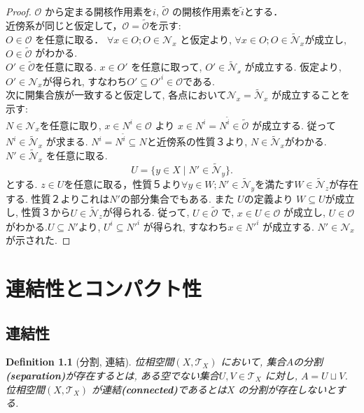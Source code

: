 \documentclass[dvipdfmx]{jbook}
\newtheorem{definition}[theorem]{Definition}
\theoremstyle{remark}
\theoremstyle{plain}
\begin{document}
\begin{proof}
	$\mathcal{O}$ から定まる開核作用素を$i$,  $\tilde{\mathcal{O}}$ の開核作用素を$\tilde{i}$とする．\\
	近傍系が同じと仮定して，$\mathcal{O} = \tilde{\mathcal{O}}$を示す: \\
	$O \in \mathcal{O}$ を任意に取る．
	$\forall x \in O; O \in \mathcal{N}_x$ と仮定より, $\forall x \in O; O \in  \mathcal{\tilde{N}}_x$が成立し, $O \in \tilde{\mathcal{O}}$ がわかる.\\
	$O' \in  \tilde{\mathcal{O}}$を任意に取る. 
	$x \in O'$ を任意に取って, $O' \in  \mathcal{\tilde{N}_x}$ が成立する.
	仮定より, $O' \in \mathcal{N}_x$が得られ, 
すなわち$ O' \subseteq  O'^{i} \in \mathcal{O}$である.\\
	次に開集合族が一致すると仮定して, 各点において$\mathcal{N}_x = \mathcal{\tilde{N}}_x$ が成立することを示す:\\
	$N \in \mathcal{N}_x$を任意に取り, $x \in N^{i} \in \mathcal{O}$ より
	$x \in  N^{i} = N^{\tilde{i}}\in  \tilde{\mathcal{O}}$ が成立する. 
	従って$N^{i} \in \mathcal{\tilde{N}}_x$ が求まる.
	$N^{i} = N^{\tilde{i}} \subseteq N$と近傍系の性質３より, $N \in \mathcal{\tilde{N}}_x$がわかる.\\
	$N' \in \mathcal{\tilde{N}}_x$ を任意に取る. 
	\[
		U =\{y \in X  \mid N' \in \mathcal{\tilde{N}}_y\} 
	.\] 
	とする. $z \in U$を任意に取る，性質５より$\forall y \in W; N' \in \mathcal{\tilde{N}}_y$を満たす$W \in \mathcal{\tilde{N}}_z$が存在する. 性質２よりこれは$N'$の部分集合でもある. また $U$の定義より $W \subseteq U$が成立し, 性質３から$U \in \mathcal{\tilde{N}}_z$が得られる. 従って, $U \in \tilde{\mathcal{O}}$ で, $x \in U \in \mathcal{O}$ が成立し, $U \in \mathcal{O}$ がわかる.$U \subseteq N'$より, $U^{i} \subseteq N'^{i}$ が得られ, すなわち$x \in N'^{i}$ が成立する. $N' \in \mathcal{N}_x$が示された.
\end{proof}

\chapter{連結性とコンパクト性}%
\label{cha:連結性とコンパクト性}


\section{連結性}

\begin{definition}[分割, 連結]
	位相空間$\left( X , \mathcal{T}_X \right) $ において, 集合$A$の分割\textbf{(separation)}が存在するとは, ある空でない集合$U,V \in \mathcal{T}_X$ に対し, $A=U \sqcup   V $. 位相空間$\left( X,\mathcal{T}_X \right) $ が連結\textbf{(connected)}であるとは$X$ の分割が存在しないとする.
\end{definition} 
\end{document}

